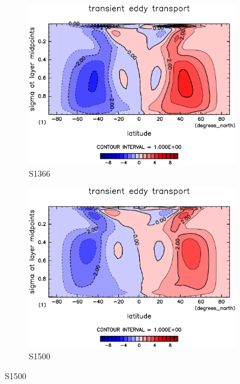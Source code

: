 \documentclass[body]{subfiles}
\begin{document}
\begin{figure}[t]
	\centering
	\begin{subfigure}{.4\textwidth}
		\centering
		\includegraphics[width=\textwidth]{S1366/MeriHeatTransTest@dryStatEn_TE,time=14600:14965-crop-rotate.pdf}
		\caption{S1366}\label{乾燥静的エネルギー移動性擾乱S1366}
	\end{subfigure}
	\begin{subfigure}{.4\textwidth}
		\centering
		\includegraphics[width=\textwidth]{S1500/MeriHeatTransTest@dryStatEn_TE,time=3650:4015-crop-rotate.pdf}
		\caption{S1500}\label{乾燥静的エネルギー移動性擾乱S1500}
	\end{subfigure}

\end{figure}
\end{document}
